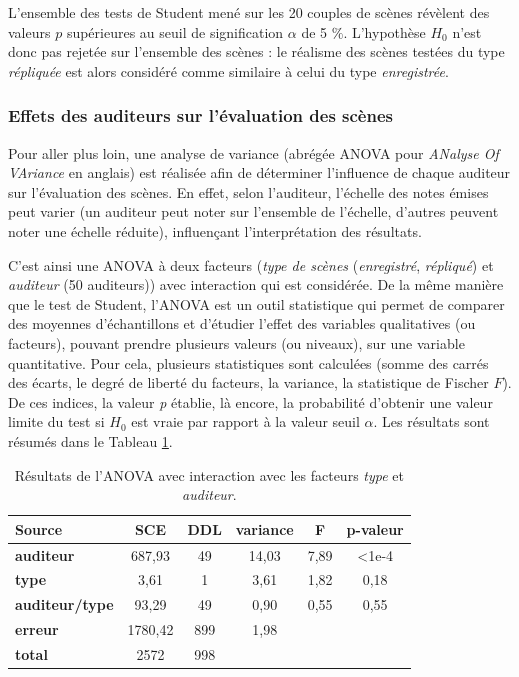 L'ensemble des tests de Student mené sur les 20 couples de scènes révèlent des valeurs $p$ supérieures au seuil de signification $\alpha$ de 5 $\%$. L'hypothèse $H_0$ n'est donc pas rejetée sur l'ensemble des scènes : le réalisme des scènes testées du type \textit{répliquée} est alors considéré comme similaire à celui du type \textit{enregistrée}.


\subsubsection{Effets des auditeurs sur l'évaluation des scènes}

Pour aller plus loin, une analyse de variance (abrégée ANOVA pour \textit{ANalyse Of VAriance} en anglais) est réalisée afin de déterminer l'influence de chaque auditeur sur l'évaluation des scènes. En effet, selon l'auditeur, l'échelle des notes émises peut varier (un auditeur peut noter sur l'ensemble de l'échelle, d'autres peuvent noter une échelle réduite), influençant l'interprétation des résultats.

C'est ainsi une ANOVA à deux facteurs (\textit{type de scènes} (\textit{enregistré}, \textit{répliqué}) et \textit{auditeur} (50 auditeurs)) avec interaction qui est considérée. De la même manière que le test de Student, l'ANOVA est un outil statistique qui permet de comparer des moyennes d'échantillons et d'étudier l'effet des variables qualitatives (ou facteurs), pouvant prendre plusieurs valeurs (ou niveaux), sur une variable quantitative.
Pour cela, plusieurs statistiques sont calculées (somme des carrés des écarts, le degré de liberté du facteurs, la variance, la statistique de Fischer $F$). De ces indices, la valeur \textit{p} établie, là encore, la probabilité d'obtenir une valeur limite du test si $H_0$ est vraie par rapport à la valeur seuil $\alpha$. Les résultats sont résumés dans le Tableau \ref{tab:anova_auditeur}.

\begin{table}[ht]
\centering
\begin{tabular}{lccccc}
\hline
\textbf{Source}     & \textbf{SCE} & \textbf{DDL} & \textbf{variance} & \textbf{F} & \textbf{p-valeur} \\
\hline
\textbf{auditeur} & 687,93 & 49 & 14,03 & 7,89 & <1e-4 \\
\hline
\textbf{type} & 3,61 & 1 & 3,61 & 1,82 & 0,18 \\
\hline
\textbf{auditeur/type} & 93,29 & 49 & 0,90 & 0,55 & 0,55 \\
\hline
\textbf{erreur}      & 1780,42 & 899 & 1,98 & &  \\
\hline
\textbf{total}      & 2572 & 998 & & & \\
\hline
\end{tabular}
\caption{Résultats de l'ANOVA avec interaction avec les facteurs \textit{type} et \textit{auditeur}.}
\label{tab:anova_auditeur}
\end{table}

